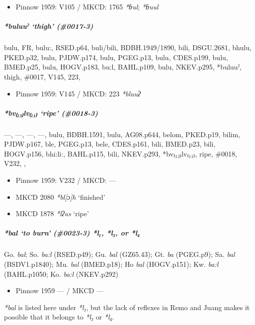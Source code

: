 \documentclass[a4paper,]{article}
\providecommand{\tightlist}{%
  \setlength{\itemsep}{0pt}\setlength{\parskip}{0pt}}
\let\oldsubparagraph\subparagraph
\renewcommand{\subparagraph}[1]{\oldsubparagraph{#1}\mbox{}}
\begin{document}
\begin{itemize}
\tightlist
\item
  Pinnow 1959: V105 / MKCD: 1765 \emph{*ɓul}; \emph{*ɓuul}
\end{itemize}

\subparagraph{\texorpdfstring{\emph{*buluuˀ} `thigh'
(\#0017-3)}{*buluuˀ thigh (\#0017-3)}}\label{buluuux2c0-thigh-0017-3}

bulu, FR, bulu:, RSED.p64, buli/bili, BDBH.1949/1890, bili, DSGU.2681,
bhulu, PKED.p32, bulu, PJDW.p174, bulu, PGEG.p13, bulu, CDES.p199, bulu,
BMED.p25, bulu, HOGV.p183, bu:l, BAHL.p109, bulu, NKEV.p295, *buluuˀ,
thigh, \#0017, V145, 223,

\begin{itemize}
\tightlist
\item
  Pinnow 1959: V145 / MKCD: 223 \emph{*bluuʔ}
\end{itemize}

\subparagraph{\texorpdfstring{\emph{*bv₍₁₃₎lv₍₁₁₎} `ripe'
(\#0018-3)}{*bv₍₁₃₎lv₍₁₁₎ ripe (\#0018-3)}}\label{bvlv-ripe-0018-3}

---, ---, ---, ---, bulu, BDBH.1591, bulu, AG08.p644, belom, PKED.p19,
bilim, PJDW.p167, ble, PGEG.p13, bele, CDES.p161, bili, BMED.p23, bili,
HOGV.p156, bhi:li:, BAHL.p115, bili, NKEV.p293, *bv₍₁₃₎lv₍₁₁₎, ripe,
\#0018, V232, ,

\begin{itemize}
\item
  Pinnow 1959: V232 / MKCD: ---
\item
  MKCD 2080 \emph{*bl{[}ɔ{]}h} `finished'
\item
  MKCD 1878 \emph{*lʔas} `ripe'
\end{itemize}

\subparagraph{\texorpdfstring{\emph{*bal} `to burn' (\#0023-3)
\emph{*l₁}, \emph{*l₃}, or
\emph{*l₄}}{*bal to burn (\#0023-3) *l₁, *l₃, or *l₄}}\label{bal-to-burn-0023-3-l-l-or-l}

Go. \emph{bal}; So. \emph{ba:l} (RSED.p49); Gu. \emph{bal} (GZ65.43);
Gt. \emph{ba} (PGEG.p9); Sa. \emph{bal} (BSDV1.p1840); Mu. \emph{bal}
(BMED.p18); Ho \emph{bal} (HOGV.p151); Kw. \emph{ba:l} (BAHL.p1050; Ko.
\emph{ba:l} (NKEV.p292)

\begin{itemize}
\tightlist
\item
  Pinnow 1959 --- / MKCD ---
\end{itemize}

\emph{*bal} is listed here under \emph{*l₁}, but the lack of reflexes in
Remo and Juang makes it possible that it belongs to \emph{*l₃} or
\emph{*l₄}.
\end{document}
